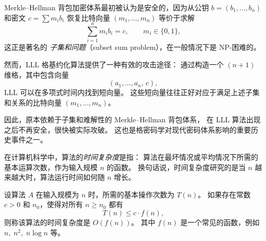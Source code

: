 \begin{remark}
Merkle--Hellman 背包加密体系最初被认为是安全的，因为从公钥 $b=(b_1,\dots,b_n)$ 
和密文 $c=\sum m_i b_i$ 恢复比特向量 $(m_1,\dots,m_n)$ 等价于求解
\[
\sum_{i=1}^n m_i b_i = c, \qquad m_i \in \{0,1\},
\]
这正是著名的 \emph{子集和问题}（subset sum problem），在一般情况下是 NP-困难的。  

然而，LLL 格基约化算法提供了一种有效的攻击途径：  
通过构造一个 $(n+1)$ 维格，其中包含向量
\[
(a_1,\dots,a_n,\,c),
\]
LLL 可以在多项式时间内找到短向量。  
这些短向量往往正好对应于满足上述子集和关系的比特向量 $(m_1,\dots,m_n)$。  

因此，原本依赖于子集和难解性的 Merkle--Hellman 背包体系，
在 LLL 算法出现之后不再安全，很快被实际攻破。  
这也是格密码学对现代密码体系影响的重要历史事件之一。
\end{remark}
\begin{definition}[时间复杂度]
在计算机科学中，算法的\emph{时间复杂度}是指：  
算法在最坏情况或平均情况下所需的基本运算次数，作为输入规模 $n$ 的函数。  
换句话说，时间复杂度研究的是当 $n$ 越来越大时，算法运行时间如何随 $n$ 增长。

\medskip

设算法 $A$ 在输入规模为 $n$ 时，所需的基本操作次数为 $T(n)$。  
如果存在常数 $c>0$ 和 $n_0$，使得对所有 $n \geq n_0$ 都有
\[
T(n) \leq c \cdot f(n),
\]
则称该算法的时间复杂度是 $O(f(n))$。  
其中 $f(n)$ 是一个常见的函数，例如 $n,\; n^2,\; n\log n$ 等。
\end{definition}
